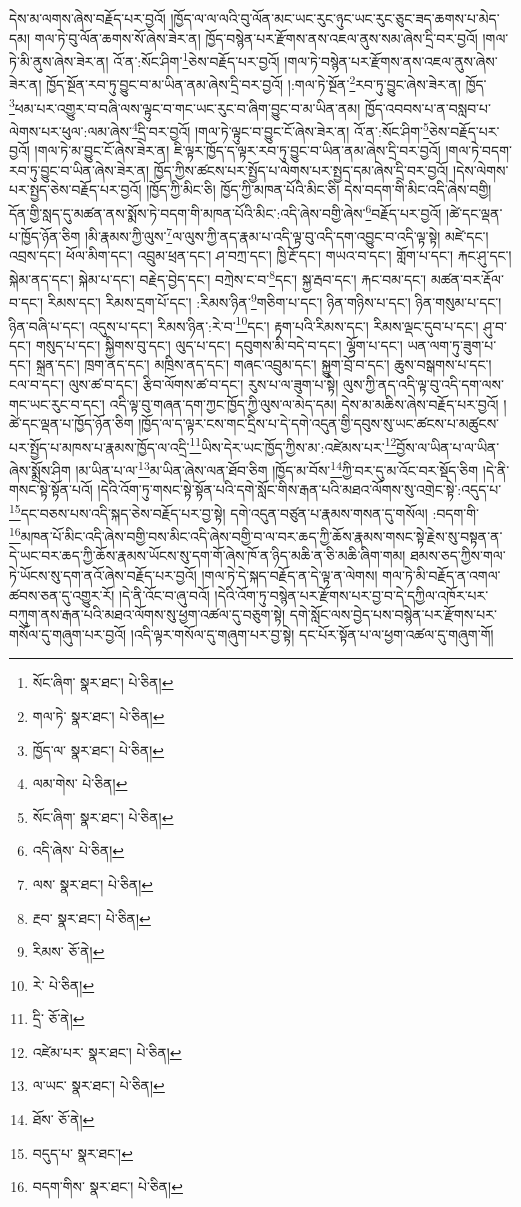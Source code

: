 དེས་མ་ལགས་ཞེས་བརྗོད་པར་བྱའོ། །ཁྱོད་ལ་ལ་ལའི་བུ་ལོན་མང་ཡང་རུང་ཉུང་ཡང་རུང་ཅུང་ཟད་ཆགས་པ་མེད་དམ། གལ་ཏེ་བུ་ལོན་ཆགས་སོ་ཞེས་ཟེར་ན། ཁྱོད་བསྙེན་པར་རྫོགས་ནས་འཇལ་ནུས་སམ་ཞེས་དྲི་བར་བྱའོ། །གལ་ཏེ་མི་ནུས་ཞེས་ཟེར་ན། འོ་ན་:སོང་ཤིག་\footnote{སོང་ཞིག་  སྣར་ཐང་།  པེ་ཅིན། }ཅེས་བརྗོད་པར་བྱའོ། །གལ་ཏེ་བསྙེན་པར་རྫོགས་ནས་འཇལ་ནུས་ཞེས་ཟེར་ན། ཁྱོད་སྔོན་རབ་ཏུ་བྱུང་བ་མ་ཡིན་ནམ་ཞེས་དྲི་བར་བྱའོ། །:གལ་ཏེ་སྔོན་\footnote{གལ་ཏེ་  སྣར་ཐང་།  པེ་ཅིན། }རབ་ཏུ་བྱུང་ཞེས་ཟེར་ན། ཁྱོད་\footnote{ཁྱོད་ལ་  སྣར་ཐང་།  པེ་ཅིན། }ཕམ་པར་འགྱུར་བ་བཞི་ལས་ལྟུང་བ་གང་ཡང་རུང་བ་ཞིག་བྱུང་བ་མ་ཡིན་ནམ། ཁྱོད་འབབས་པ་ན་བསླབ་པ་ལེགས་པར་ཕུལ་:ལམ་ཞེས་\footnote{ལམ་གེས་  པེ་ཅིན། }དྲི་བར་བྱའོ། །གལ་ཏེ་ལྟུང་བ་བྱུང་ངོ་ཞེས་ཟེར་ན། འོ་ན་:སོང་ཤིག་\footnote{སོང་ཞིག་  སྣར་ཐང་།  པེ་ཅིན། }ཅེས་བརྗོད་པར་བྱའོ། །གལ་ཏེ་མ་བྱུང་ངོ་ཞེས་ཟེར་ན། ཇི་ལྟར་ཁྱོད་ད་ལྟར་རབ་ཏུ་བྱུང་བ་ཡིན་ནམ་ཞེས་དྲི་བར་བྱའོ། །གལ་ཏེ་བདག་རབ་ཏུ་བྱུང་བ་ཡིན་ཞེས་ཟེར་ན། ཁྱོད་ཀྱིས་ཚངས་པར་སྤྱོད་པ་ལེགས་པར་སྤྱད་དམ་ཞེས་དྲི་བར་བྱའོ། །དེས་ལེགས་པར་སྤྱད་ཅེས་བརྗོད་པར་བྱའོ། །ཁྱོད་ཀྱི་མིང་ཅི། ཁྱོད་ཀྱི་མཁན་པོའི་མིང་ཅི། དེས་བདག་གི་མིང་འདི་ཞེས་བགྱི། དོན་གྱི་སླད་དུ་མཚན་ནས་སྨོས་ཏེ་བདག་གི་མཁན་པོའི་མིང་:འདི་ཞེས་བགྱི་ཞེས་\footnote{འདི་ཞེས་  པེ་ཅིན། }བརྗོད་པར་བྱའོ། །ཚེ་དང་ལྡན་པ་ཁྱོད་ཉོན་ཅིག །མི་རྣམས་ཀྱི་ལུས་\footnote{ལས་  སྣར་ཐང་།  པེ་ཅིན། }ལ་ལུས་ཀྱི་ནད་རྣམ་པ་འདི་ལྟ་བུ་འདི་དག་འབྱུང་བ་འདི་ལྟ་སྟེ། མཛེ་དང་། འབྲས་དང་། ཕོལ་མིག་དང་། འབྲུམ་ཕྲན་དང་། ཤ་བཀྲ་དང་། ཁྱི་རྔོ་དང་། གཡའ་བ་དང་། གློག་པ་དང་། རྐང་ཤུ་དང་། སྐེམ་ནད་དང་། སྐེམ་པ་དང་། བརྗེད་བྱེད་དང་། བཀྲེས་ང་བ་\footnote{རྔབ་  སྣར་ཐང་།  པེ་ཅིན། }དང་། སྐྱ་རྦབ་དང་། རྐང་བམ་དང་། མཚན་བར་རྡོལ་བ་དང་། རིམས་དང་། རིམས་དྲག་པོ་དང་། :རིམས་ཉིན་\footnote{རིམས་  ཅོ་ནེ། }གཅིག་པ་དང་། ཉིན་གཉིས་པ་དང་། ཉིན་གསུམ་པ་དང་། ཉིན་བཞི་པ་དང་། འདུས་པ་དང་། རིམས་ཉིན་:རེ་བ་\footnote{རེ་  པེ་ཅིན། }དང་། རྟག་པའི་རིམས་དང་། རིམས་ལྡང་དུབ་པ་དང་། ཤུ་བ་དང་། གསུད་པ་དང་། སྐྱིགས་བུ་དང་། ལུད་པ་དང་། དབུགས་མི་བདེ་བ་དང་། ལྷོག་པ་དང་། ཡན་ལག་ཏུ་ཟུག་པ་དང་། སྐྲན་དང་། ཁྲག་ནད་དང་། མཁྲིས་ནད་དང་། གཞང་འབྲུམ་དང་། སྐྱུག་བྲོ་བ་དང་། ཆུས་བསྒགས་པ་དང་། ངལ་བ་དང་། ལུས་ཚ་བ་དང་། རྩིབ་ལོགས་ཚ་བ་དང་། རུས་པ་ལ་ཟུག་པ་སྟེ། ལུས་ཀྱི་ནད་འདི་ལྟ་བུ་འདི་དག་ལས་གང་ཡང་རུང་བ་དང་། འདི་ལྟ་བུ་གཞན་དག་ཀྱང་ཁྱོད་ཀྱི་ལུས་ལ་མེད་དམ། དེས་མ་མཆིས་ཞེས་བརྗོད་པར་བྱའོ། །ཚེ་དང་ལྡན་པ་ཁྱོད་ཉོན་ཅིག །ཁྱོད་ལ་ད་ལྟར་ངས་གང་དྲིས་པ་དེ་དགེ་འདུན་གྱི་དབུས་སུ་ཡང་ཚངས་པ་མཚུངས་པར་སྤྱོད་པ་མཁས་པ་རྣམས་ཁྱོད་ལ་འདྲི་\footnote{དྲི་  ཅོ་ནེ། }ཡིས་དེར་ཡང་ཁྱོད་ཀྱིས་མ་:འཛེམས་པར་\footnote{འཛེམ་པར་  སྣར་ཐང་།  པེ་ཅིན། }བྱོས་ལ་ཡིན་པ་ལ་ཡིན་ཞེས་སྨྲོས་ཤིག །མ་ཡིན་པ་ལ་\footnote{ལ་ཡང་  སྣར་ཐང་།  པེ་ཅིན། }མ་ཡིན་ཞེས་ལན་ཐོབ་ཅིག །ཁྱོད་མ་བོས་\footnote{ཐོས་  ཅོ་ནེ། }ཀྱི་བར་དུ་མ་འོང་བར་སྡོད་ཅིག །དེ་ནི་གསང་སྟེ་སྟོན་པའོ། །དེའི་འོག་ཏུ་གསང་སྟེ་སྟོན་པའི་དགེ་སློང་གིས་རྒན་པའི་མཐའ་ལོགས་སུ་འགྲེང་སྟེ་:འདུད་པ་\footnote{བདུད་པ་  སྣར་ཐང་། }དང་བཅས་པས་འདི་སྐད་ཅེས་བརྗོད་པར་བྱ་སྟེ། དགེ་འདུན་བཙུན་པ་རྣམས་གསན་དུ་གསོལ། :བདག་གི་\footnote{བདག་གིས་  སྣར་ཐང་།  པེ་ཅིན། }མཁན་པོ་མིང་འདི་ཞེས་བགྱི་བས་མིང་འདི་ཞེས་བགྱི་བ་ལ་བར་ཆད་ཀྱི་ཆོས་རྣམས་གསང་སྟེ་རྗེས་སུ་བསྟན་ན་དེ་ཡང་བར་ཆད་ཀྱི་ཆོས་རྣམས་ཡོངས་སུ་དག་གོ་ཞེས་ཁོ་ན་ཉིད་མཆི་ན་ཅི་མཆི་ཞིག་གམ། ཐམས་ཅད་ཀྱིས་གལ་ཏེ་ཡོངས་སུ་དག་ནའོ་ཞེས་བརྗོད་པར་བྱའོ། །གལ་ཏེ་དེ་སྐད་བརྗོད་ན་དེ་ལྟ་ན་ལེགས། གལ་ཏེ་མི་བརྗོད་ན་འགལ་ཚབས་ཅན་དུ་འགྱུར་རོ། །དེ་ནི་འོང་བ་ཞུ་བའོ། །དེའི་འོག་ཏུ་བསྙེན་པར་རྫོགས་པར་བྱ་བ་དེ་དཀྱིལ་འཁོར་པར་བཀུག་ནས་རྒན་པའི་མཐའ་ལོགས་སུ་ཕྱག་འཚལ་དུ་བཅུག་སྟེ། དགེ་སློང་ལས་བྱེད་པས་བསྙེན་པར་རྫོགས་པར་གསོལ་དུ་གཞུག་པར་བྱའོ། །འདི་ལྟར་གསོལ་དུ་གཞུག་པར་བྱ་སྟེ། དང་པོར་སྟོན་པ་ལ་ཕྱག་འཚལ་དུ་གཞུག་གོ། 
